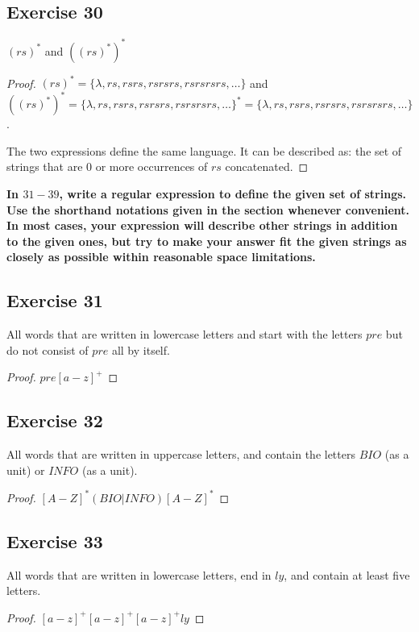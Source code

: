 \documentclass[14pt]{extarticle}
\newcommand{\cy}{\color{cyan}}
\begin{document}
\subsection{Exercise 30}
\((rs)^*\) and \(((rs)^*)^*\)

\begin{proof}
\((rs)^* = \{\lambda, rs, rsrs, rsrsrs, rsrsrsrs, \ldots\}\) and \\
\(((rs)^*)^* = \{\lambda, rs, rsrs, rsrsrs, rsrsrsrs, \ldots\}^* = \{\lambda, rs, rsrs, rsrsrs, rsrsrsrs, \ldots\}\).

The two expressions define the same language. It can be described as: the set of strings that are 0 or more 
occurrences of \(rs\) concatenated.
\end{proof}

{\bf \cy In \(31-39\), write a regular expression to define the given set of strings. Use the shorthand notations given in 
the section whenever convenient. In most cases, your expression will describe other strings in addition to the 
given ones, but try to make your answer fit the given strings as closely as possible within reasonable space limitations.}

\subsection{Exercise 31}
All words that are written in lowercase letters and start with the letters \(pre\) but do not consist of \(pre\) all by 
itself.

\begin{proof}
\(pre[a - z]^+\)
\end{proof}

\subsection{Exercise 32}
All words that are written in uppercase letters, and contain the letters \(BIO\) (as a unit) or \(INFO\) (as a unit).

\begin{proof}
\([A-Z]^*(BIO | INFO)[A-Z]^*\)
\end{proof}

\subsection{Exercise 33}
All words that are written in lowercase letters, end in \(ly\), and contain at least five letters.

\begin{proof}
\([a-z]^+[a-z]^+[a-z]^+ ly\)
\end{proof}
\end{document}
